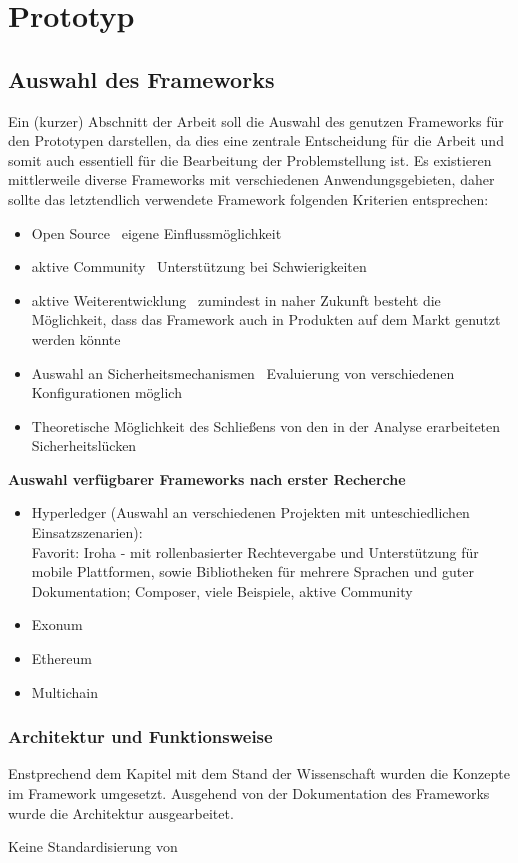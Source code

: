 \section{Prototyp}
\label{sec:prototype}

\subsection{Auswahl des Frameworks}
    Ein (kurzer) Abschnitt der Arbeit soll die Auswahl des genutzen Frameworks für den Prototypen darstellen, da dies eine zentrale Entscheidung für die Arbeit und somit auch essentiell für die Bearbeitung der Problemstellung ist.
    Es existieren mittlerweile diverse Frameworks mit verschiedenen Anwendungsgebieten, daher sollte das letztendlich verwendete Framework folgenden Kriterien entsprechen:
    \begin{itemize}
        \item Open Source \textrightarrow\ eigene Einflussmöglichkeit
        \item aktive Community \textrightarrow\ Unterstützung bei Schwierigkeiten
        \item aktive Weiterentwicklung \textrightarrow\ zumindest in naher Zukunft besteht die Möglichkeit, dass das Framework auch in Produkten auf dem Markt genutzt werden könnte
        \item Auswahl an Sicherheitsmechanismen \textrightarrow\ Evaluierung von verschiedenen Konfigurationen möglich
        \item Theoretische Möglichkeit des Schließens von den in der Analyse erarbeiteten Sicherheitslücken
    \end{itemize}
    \medskip
    \textbf{Auswahl verfügbarer Frameworks nach erster Recherche}
    \begin{itemize}
        \item Hyperledger (Auswahl an verschiedenen Projekten mit unteschiedlichen Einsatzszenarien):\\
            Favorit: Iroha - mit rollenbasierter Rechtevergabe und Unterstützung für mobile Plattformen, sowie Bibliotheken für mehrere Sprachen und guter Dokumentation; Composer, viele Beispiele, aktive Community
        \item Exonum
        \item Ethereum
        \item Multichain
    \end{itemize}



\subsubsection{Architektur und Funktionsweise}
    Enstprechend dem Kapitel mit dem Stand der Wissenschaft wurden die Konzepte im Framework umgesetzt.
    Ausgehend von der Dokumentation des Frameworks \cite{SoramitsuCo.} wurde die Architektur ausgearbeitet. 
    
    
    Keine Standardisierung von 